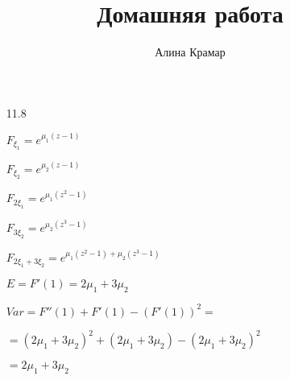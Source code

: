 \documentclass{article}
\begin{document}
\title{Домашняя работа}
\author{Алина Крамар}

\maketitle
\begin{enumerate}

\item[11.8]

$F_{\xi_{1}} = e^{\mu_{1}(z-1)}$

$F_{\xi_{2}} = e^{\mu_{2}(z-1)}$

$F_{2\xi_{1}} = e^{\mu_{1}(z^{2}-1)}$

$F_{3\xi_{2}} = e^{\mu_{2}(z^{3}-1)}$

$F_{2\xi_{1} + 3\xi_{2}} = e^{\mu_{1}(z^{2} - 1) + \mu_{2}(z^3-1)}$

$E = F'(1) = 2\mu_{1} + 3\mu_{2}$

$Var = F''(1) + F'(1) - (F'(1))^2 = $

$ = (2\mu_{1} + 3\mu_{2})^2 + (2\mu_{1} + 3\mu_{2}) - (2\mu_{1} + 3\mu_{2})^2$

$ = 2\mu_{1} + 3\mu_{2}$

\end{enumerate}
\end{document}
